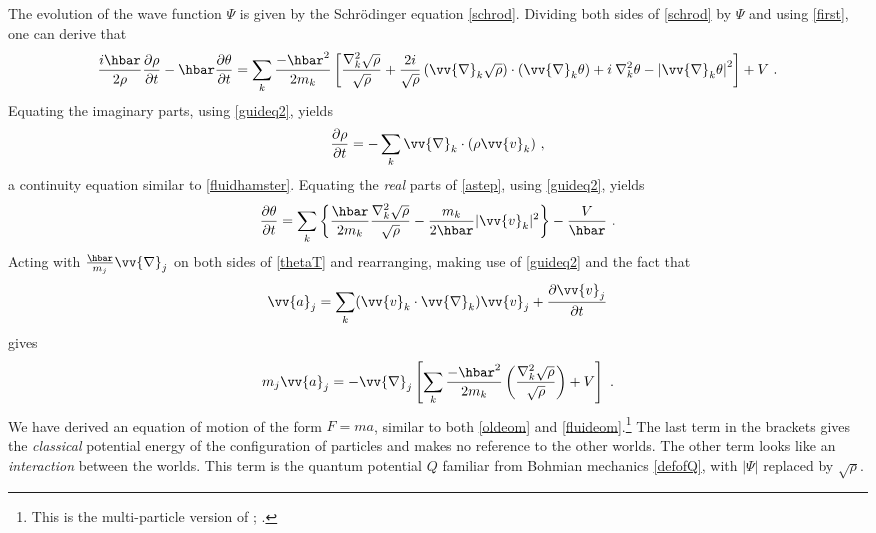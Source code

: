 \documentclass[onecolumn,secnumarabic,balancelastpage,amsmath,amssymb,nofootinbib]{article}
\begin{document}
The evolution of the wave function $\Psi$ is given by the Schr\"{o}dinger equation \eqref{schrod}.  Dividing both sides of \eqref{schrod} by $\Psi$ and using \eqref{first}, one can derive that
\begin{equation}
\frac{i\hbar}{2\rho}\frac{\partial\rho}{\partial t}-\hbar \frac{\partial \theta}{\partial t} = \sum_k{\frac{-\hbar^2}{2 m_k}\left[\frac{\nabla_k^2 \sqrt{\rho}}{\sqrt{\rho}}+\frac{2 i}{\sqrt{\rho}} \left(\vv{\nabla}_k \sqrt{\rho}\right)\cdot\left(\vv{\nabla}_k \theta\right) + i \: \nabla_k^2 \theta - \left|\vv{\nabla}_k \theta\right|^2\right]}+V\ .
\label{astep}
\end{equation}
Equating the imaginary parts, using \eqref{guideq2}, yields
\begin{equation}
\frac{\partial\rho}{\partial t}=-\sum_k{\vv{\nabla}_k \cdot \left(\rho\vv{v}_k\right)}\ ,
\label{hamster}
\end{equation}
a continuity equation similar to \eqref{fluidhamster}.  Equating the \emph{real} parts of \eqref{astep}, using \eqref{guideq2}, yields
\begin{equation}
\frac{\partial \theta}{\partial t}=\sum_k{\left\{\frac{\hbar}{2 m_k}\frac{\nabla_k^2 \sqrt{\rho}}{\sqrt{\rho}}-\frac{m_k}{2 \hbar}|\vv{v}_k|^2\right\}}-\frac{V}{\hbar}\ .
\label{thetaT}
\end{equation}
Acting with $\frac{\hbar}{m_j}\vv{\nabla}_j$ on both sides of \eqref{thetaT} and rearranging, making use of \eqref{guideq2} and the fact that
\begin{equation}
\vv{a}_j=\sum_k (\vv{v}_k\cdot\vv{\nabla}_k)\vv{v}_j+\frac{\partial \vv{v}_j}{\partial t}
\label{accel}
\end{equation}
gives
\begin{equation}
m_j \vv{a}_j=-\vv{\nabla}_j\left[\sum_k \frac{-\hbar^2}{2 m_k }\left(\frac{\nabla_k^2 \sqrt{\rho}}{\sqrt{\rho}}\right)+V\right]\ .
\label{eom}
\end{equation}
We have derived an equation of motion of the form $F=ma$, similar to both \eqref{oldeom} and \eqref{fluideom}.\footnote{This is the multi-particle version of \citet[][eq. 1.7]{wyatt2005}; \citet[][eq. 4.9]{holland2005}.}  The last term in the brackets gives the \emph{classical} potential energy of the configuration of particles and makes no reference to the other worlds.  The other term looks like an \emph{interaction} between the worlds. This term is the quantum potential $Q$ familiar from Bohmian mechanics \eqref{defofQ}, with $|\Psi|$ replaced by $\sqrt{\rho}$.
\end{document}
